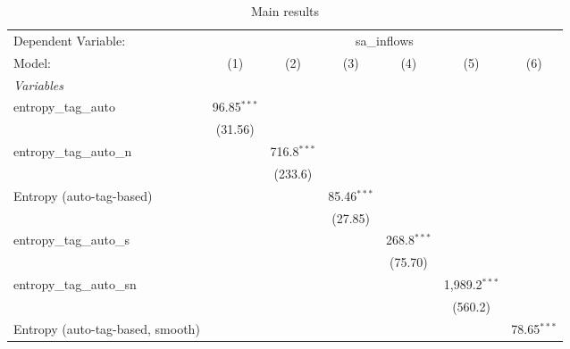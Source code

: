 
\begin{table}[htbp]
   \centering
   \caption{\label{tab:reg_sa_inflows_tag_auto.tex} Main results}
   \begin{footnotesize}
      \begin{tabular}{lcccccc}
         \tabularnewline\midrule\midrule
         Dependent Variable: & \multicolumn{6}{c}{sa\_inflows}\\
         Model:                           & (1)            & (2)            & (3)            & (4)            & (5)             & (6)\\
         \midrule \emph{Variables} &   &   &   &   &   &  \\
         entropy\_tag\_auto             & 96.85$^{***}$  &                &                &                &                 &   \\
                                          & (31.56)        &                &                &                &                 &   \\
         entropy\_tag\_auto\_n         &                & 716.8$^{***}$  &                &                &                 &   \\
                                          &                & (233.6)        &                &                &                 &   \\
         Entropy (auto-tag-based)         &                &                & 85.46$^{***}$  &                &                 &   \\
                                          &                &                & (27.85)        &                &                 &   \\
         entropy\_tag\_auto\_s         &                &                &                & 268.8$^{***}$  &                 &   \\
                                          &                &                &                & (75.70)        &                 &   \\
         entropy\_tag\_auto\_sn        &                &                &                &                & 1,989.2$^{***}$ &   \\
                                          &                &                &                &                & (560.2)         &   \\
         Entropy (auto-tag-based, smooth) &                &                &                &                &                 & 78.65$^{***}$\\

\end{tabular}
\end{footnotesize}
\end{table}
